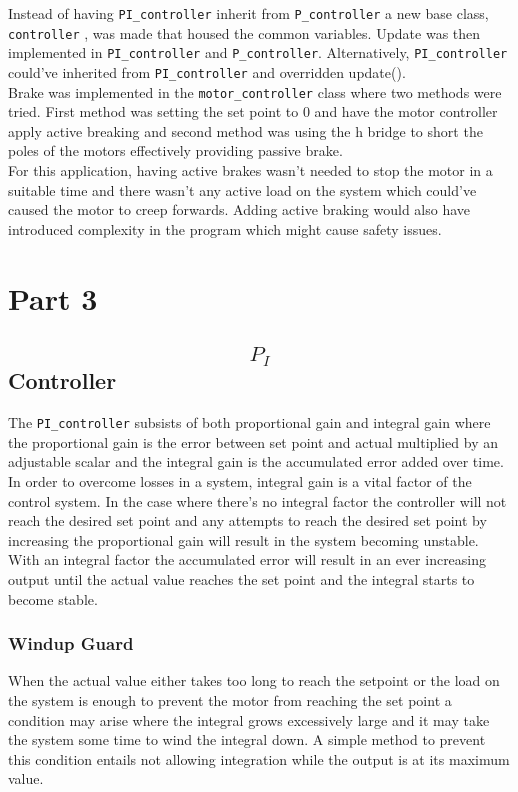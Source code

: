 \documentclass{article}
\begin{document}
Instead of having \verb!PI_controller! inherit from \verb!P_controller! a new base class, \verb!controller! , was made that housed the common variables. Update was then implemented in \verb!PI_controller! and \verb!P_controller!. Alternatively, \verb!PI_controller! could've inherited from \verb!PI_controller! and overridden update().
\\
Brake was implemented in the \verb!motor_controller! class where two methods were tried. First method was setting the set point to 0 and have the motor controller apply active breaking and second method was using the h bridge to short the poles of the motors effectively providing passive brake. 
\\
For this application, having active brakes wasn't needed to stop the motor in a suitable time and there wasn't any active load on the system which could've caused the motor to creep forwards. Adding active braking would also have introduced complexity in the program which might cause safety issues. 

\section*{Part 3}

\subsection*{$$P_I$$ Controller}
The \verb!PI_controller! subsists of both proportional gain and integral gain where the proportional gain is the error between set point and actual multiplied by an adjustable scalar and the integral gain is the accumulated error added over time.
\\
In order to overcome losses in a system, integral gain is a vital factor of the control system. In the case where there's no integral factor the controller will not reach the desired set point and any attempts to reach the desired set point by increasing the proportional gain will result in the system becoming unstable.
\\
With an integral factor the accumulated error will result in an ever increasing output until the actual value reaches the set point and the integral starts to become stable.

\subsubsection{Windup Guard}

When the actual value either takes too long to reach the setpoint or the load on the system is enough to prevent the motor from reaching the set point a condition may arise where the integral grows excessively large and it may take the system some time to wind the integral down. A simple method  to prevent this condition entails not allowing integration while the output is at its maximum value.
\end{document}
